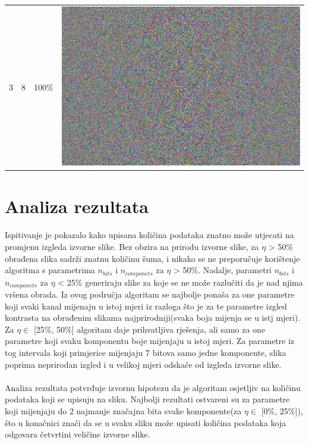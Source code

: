 \documentclass[times, utf8, seminar]{fer}
\begin{document}
\begin{center}
\begin{longtable}{|c|c|c|c|}
3 & 8 &100\% & \includegraphics[scale=0.3]{../benchmark_results/pattern/3_components-8_bits.png} \\
\end{longtable}
\end{center}

\section{Analiza rezultata}
\paragraph{}
Ispitivanje je pokazalo kako upisana količina podataka znatno može utjecati na promjenu izgleda izvorne slike. Bez obzira na prirodu izvorne slike, za $\eta$ > 50\% obrađena slika sadrži znatnu količinu šuma, i nikako se ne preporučuje korištenje algoritma s parametrima $n_{bits}$ i $n_{componets}$ za $\eta$ > 50\%. Nadalje, parametri $n_{bits}$ i $n_{componets}$ za $\eta$ < 25\% generiraju slike za koje se ne može razlučiti da je nad njima vršena obrada. Iz ovog područja algoritam se najbolje ponaša za one parametre koji svaki kanal mijenaju u istoj mjeri iz razloga što je za te parametre izgled kontrasta na obrađenim slikama najprirodniji(svaka boja mijenja se u istj mjeri). Za $\eta \in$ [25\%, 50\%] algoritam daje prihvatljiva rješenja, ali samo za one parametre koji svaku komponentu boje mijenjaju u istoj mjeri. Za parametre iz tog intervala koji primjerice mijenjaju 7 bitova samo jedne komponente, slika poprima neprirodan izgled i u velikoj mjeri odskače od izgleda izvorne slike.
\paragraph{}
Analiza rezultata potvrđuje izvornu hipotezu da je algoritam osjetljiv na količinu podataka koji se upisuju na sliku. Najbolji rezultati ostvareni su za parametre koji mijenjaju do 2 najmanje značajna bita svake komponente(za $\eta \in$ [0\%, 25\%]), što u konačnici znači da se u svaku sliku može upisati količina podataka koja odgovara četvrtini veličine izvorne slike.
\end{document}

